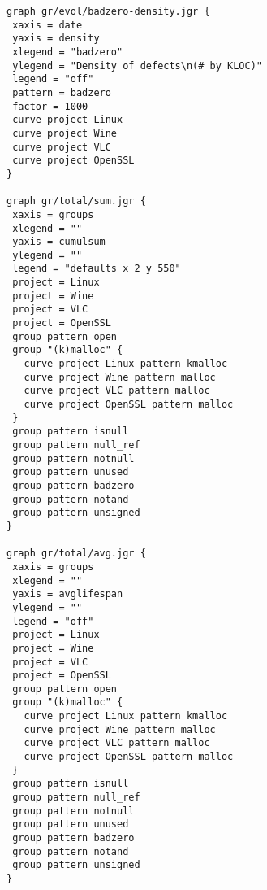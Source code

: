 \begin{multicols}{2}
\begin{lstlisting}
graph gr/evol/badzero-density.jgr {
 xaxis = date
 yaxis = density
 xlegend = "badzero"
 ylegend = "Density of defects\n(# by KLOC)"
 legend = "off"
 pattern = badzero
 factor = 1000
 curve project Linux
 curve project Wine
 curve project VLC
 curve project OpenSSL
}

graph gr/total/sum.jgr {
 xaxis = groups
 xlegend = ""
 yaxis = cumulsum
 ylegend = ""
 legend = "defaults x 2 y 550"
 project = Linux
 project = Wine
 project = VLC
 project = OpenSSL
 group pattern open
 group "(k)malloc" {
   curve project Linux pattern kmalloc
   curve project Wine pattern malloc
   curve project VLC pattern malloc
   curve project OpenSSL pattern malloc
 }
 group pattern isnull
 group pattern null_ref
 group pattern notnull
 group pattern unused
 group pattern badzero
 group pattern notand
 group pattern unsigned
}

graph gr/total/avg.jgr {
 xaxis = groups
 xlegend = ""
 yaxis = avglifespan
 ylegend = ""
 legend = "off"
 project = Linux
 project = Wine
 project = VLC
 project = OpenSSL
 group pattern open
 group "(k)malloc" {
   curve project Linux pattern kmalloc
   curve project Wine pattern malloc
   curve project VLC pattern malloc
   curve project OpenSSL pattern malloc
 }
 group pattern isnull
 group pattern null_ref
 group pattern notnull
 group pattern unused
 group pattern badzero
 group pattern notand
 group pattern unsigned
}
\end{lstlisting}
\end{multicols}

